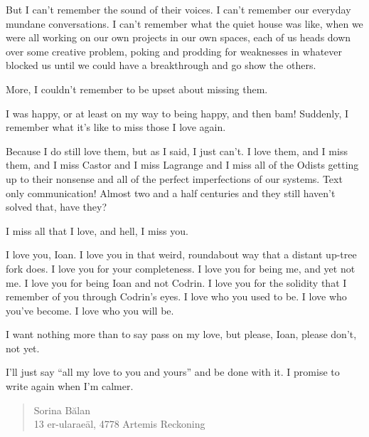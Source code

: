 But I can't remember the sound of their voices. I can't remember our everyday mundane conversations. I can't remember what the quiet house was like, when we were all working on our own projects in our own spaces, each of us heads down over some creative problem, poking and prodding for weaknesses in whatever blocked us until we could have a breakthrough and go show the others.

More, I couldn't remember to be upset about missing them.

I was happy, or at least on my way to being happy, and then bam! Suddenly, I remember what it's like to miss those I love again.

Because I do still love them, but as I said, I just can't. I love them, and I miss them, and I miss Castor and I miss Lagrange and I miss all of the Odists getting up to their nonsense and all of the perfect imperfections of our systems. Text only communication! Almost two and a half centuries and they still haven't solved that, have they?

I miss all that I love, and hell, I miss you.

I love you, Ioan. I love you in that weird, roundabout way that a distant up-tree fork does. I love you for your completeness. I love you for being me, and yet not me. I love you for being Ioan and not Codrin. I love you for the solidity that I remember of you through Codrin's eyes. I love who you used to be. I love who you've become. I love who you will be.

I want nothing more than to say pass on my love, but please, Ioan, please don't, not yet.

I'll just say ``all my love to you and yours'' and be done with it. I promise to write again when I'm calmer.

\begin{quote}
Sorina Bălan\\
13 er-ularaeäl, 4778 Artemis Reckoning
\end{quote}
